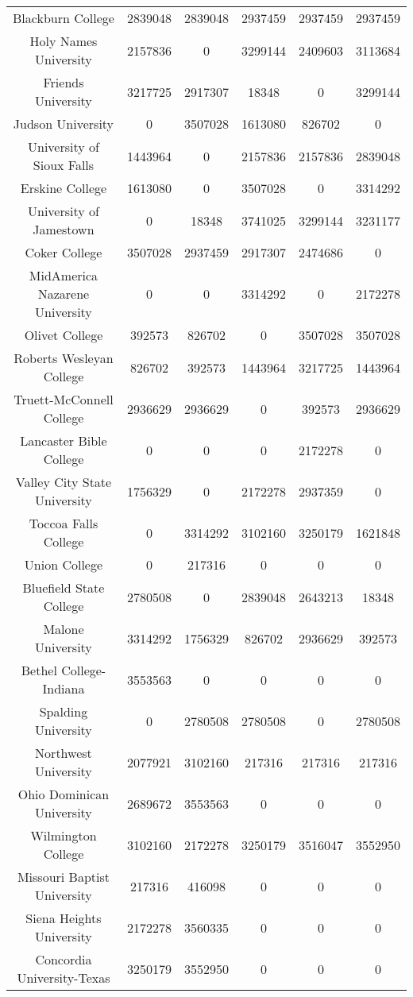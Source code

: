 \documentclass{mcmthesis}
\begin{document}
\begin{appendices}
\begin{table}[h]
\begin{tabular}{cccccc}
Blackburn College & 2839048 & 2839048 & 2937459 & 2937459 & 2937459\\
Holy Names University & 2157836 & 0 & 3299144 & 2409603 & 3113684\\
Friends University & 3217725 & 2917307 & 18348 & 0 & 3299144\\
Judson University & 0 & 3507028 & 1613080 & 826702 & 0\\
University of Sioux Falls & 1443964 & 0 & 2157836 & 2157836 & 2839048\\
Erskine College & 1613080 & 0 & 3507028 & 0 & 3314292\\
University of Jamestown & 0 & 18348 & 3741025 & 3299144 & 3231177\\
Coker College & 3507028 & 2937459 & 2917307 & 2474686 & 0\\
MidAmerica Nazarene University & 0 & 0 & 3314292 & 0 & 2172278\\
Olivet College & 392573 & 826702 & 0 & 3507028 & 3507028\\
Roberts Wesleyan College & 826702 & 392573 & 1443964 & 3217725 & 1443964\\
Truett-McConnell College & 2936629 & 2936629 & 0 & 392573 & 2936629\\
Lancaster Bible College & 0 & 0 & 0 & 2172278 & 0\\
Valley City State University & 1756329 & 0 & 2172278 & 2937359 & 0\\
Toccoa Falls College & 0 & 3314292 & 3102160 & 3250179 & 1621848\\
Union College & 0 & 217316 & 0 & 0 & 0\\
Bluefield State College & 2780508 & 0 & 2839048 & 2643213 & 18348\\
Malone University & 3314292 & 1756329 & 826702 & 2936629 & 392573\\
Bethel College-Indiana & 3553563 & 0 & 0 & 0 & 0\\
Spalding University & 0 & 2780508 & 2780508 & 0 & 2780508\\
Northwest University & 2077921 & 3102160 & 217316 & 217316 & 217316\\
Ohio Dominican University & 2689672 & 3553563 & 0 & 0 & 0\\
Wilmington College & 3102160 & 2172278 & 3250179 & 3516047 & 3552950\\
Missouri Baptist University & 217316 & 416098 & 0 & 0 & 0\\
Siena Heights University & 2172278 & 3560335 & 0 & 0 & 0\\
Concordia University-Texas & 3250179 & 3552950 & 0 & 0 & 0\\

\end{tabular}
\end{table}
\end{appendices}
\end{document}
